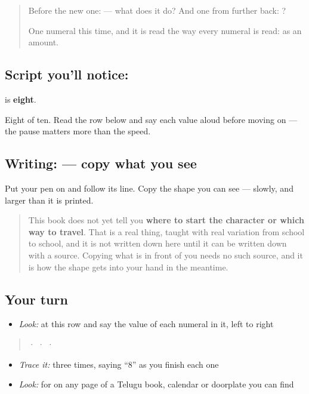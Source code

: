 \label{lesson:TE-S147-digit-8}



\begin{quote}
Before the new one:  — what does it do? And one from further back: ?

One numeral this time, and it is read the way every numeral is read: as an amount.
\end{quote}

\subsection*{Script you'll notice: }
\textbf{} is \textbf{eight}.

Eight of ten. Read the row below and say each value aloud before moving on — the pause matters more than the speed.

\subsection*{Writing:  — copy what you see}
Put your pen on  and follow its line. Copy the shape you can see — slowly, and larger than it is printed.

\begin{quote}
This book does not yet tell you \textbf{where to start the character or which way to travel}. That is a real thing, taught with real variation from school to school, and it is not written down here until it can be written down with a source. Copying what is in front of you needs no such source, and it is how the shape gets into your hand in the meantime.
\end{quote}

\subsection*{Your turn}
\begin{itemize}
\raggedright
  \item \emph{Look:} at this row and say the value of each numeral in it, left to right
\end{itemize}

\begin{quote}
  ·    ·    ·  
\end{quote}

\begin{itemize}
\raggedright
  \item \emph{Trace it:}  three times, saying \textquotedblleft{}8\textquotedblright{} as you finish each one
  \item \emph{Look:} for  on any page of a Telugu book, calendar or doorplate you can find
\end{itemize}

